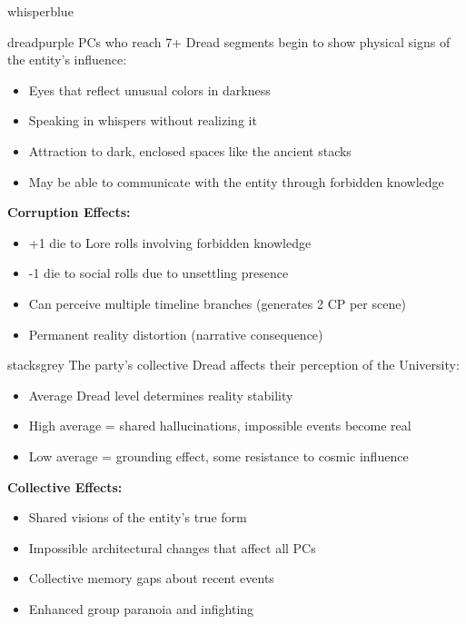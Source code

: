 \documentclass[11pt]{article}
\begin{document}
\begin{campaignsection}{whisperblue}
\begin{mechanicbox}{dreadpurple}
PCs who reach 7+ Dread segments begin to show physical signs of the entity's influence:
\begin{itemize}
    \item Eyes that reflect unusual colors in darkness
    \item Speaking in whispers without realizing it
    \item Attraction to dark, enclosed spaces like the ancient stacks
    \item May be able to communicate with the entity through forbidden knowledge
\end{itemize}
\textbf{Corruption Effects:}
\begin{itemize}
    \item +1 die to Lore rolls involving forbidden knowledge
    \item -1 die to social rolls due to unsettling presence
    \item Can perceive multiple timeline branches (generates 2 CP per scene)
    \item Permanent reality distortion (narrative consequence)
\end{itemize}
\end{mechanicbox}

\begin{mechanicbox}{stacksgrey}
The party's collective Dread affects their perception of the University:
\begin{itemize}
    \item Average Dread level determines reality stability
    \item High average = shared hallucinations, impossible events become real
    \item Low average = grounding effect, some resistance to cosmic influence
\end{itemize}
\textbf{Collective Effects:}
\begin{itemize}
    \item Shared visions of the entity's true form
    \item Impossible architectural changes that affect all PCs
    \item Collective memory gaps about recent events
    \item Enhanced group paranoia and infighting
\end{itemize}
\end{mechanicbox}
\end{campaignsection}
\end{document}
